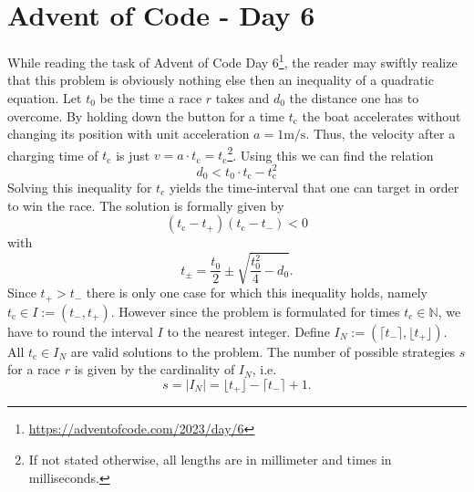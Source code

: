 \documentclass{article}
\newcommand{\tc}{t_\text{c}}
\begin{document}
\section*{Advent of Code - Day 6}
While reading the task of Advent of Code Day 6\footnote{\url{https://adventofcode.com/2023/day/6}}, 
the reader may swiftly realize that this problem is obviously nothing else then an inequality of a quadratic equation.
Let $t_0$ be the time a race $r$ takes and $d_0$ the distance one has to overcome. 
By holding down the button for a time $\tc$ the boat accelerates without changing its position with unit acceleration $a = 1\text{m}/\text{s}$.
Thus, the velocity after a charging time of $\tc$ is just $v = a \cdot \tc = \tc$\footnote{If not stated otherwise, all lengths are in millimeter and times in milliseconds.}.
Using this we can find the relation 
\begin{equation}
    d_0 < t_0\cdot \tc -\tc^2
    \label{constraint}
\end{equation}
Solving this inequality for $\tc$ yields the time-interval that one can target in order to win the race. 
The solution is formally given by 
\begin{equation}
    (\tc-t_+)(\tc-t_-) < 0
\end{equation}
with 
\begin{equation}
        t_\pm = \frac{t_0}{2} \pm \sqrt{\frac{t_0^2}{4} - d_0}.
        \label{eq:time_interval}
\end{equation}
Since $t_+>t_-$ there is only one case for which this inequality holds, namely $\tc \in I:=(t_-, t_+)$.
However since the problem is formulated for times $\tc \in \mathbb{N}$, we have to round the interval $I$ to the nearest integer.
Define $I_N:=(\lceil t_-\rceil, \lfloor t_+ \rfloor)$. All $\tc \in I_N$ are valid solutions to the problem.
The number of possible strategies $s$ for a race $r$ is given by the cardinality of $I_N$, i.e. 
\begin{equation}
    s=|I_N| = \lfloor t_+ \rfloor - \lceil t_- \rceil + 1.
    \label{eq:number_of_strategies}
\end{equation}
\end{document}
